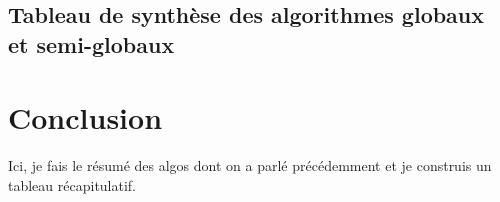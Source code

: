 \documentclass[11pt,a4paper,oneside]{report}
\begin{document}
\subsection{Tableau de synthèse des algorithmes globaux et semi-globaux}

\section{Conclusion}

Ici, je fais le résumé des algos dont on a parlé précédemment et je construis un tableau récapitulatif. 



\end{document}

